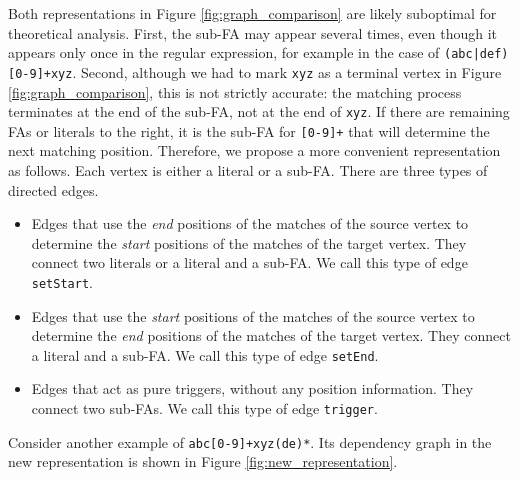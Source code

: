 Both representations in Figure \ref{fig:graph_comparison} are likely suboptimal for theoretical analysis. First, the sub-FA may appear several times, even though it appears only once in the regular expression, for example in the case of \texttt{(abc|def)[0-9]+xyz}. Second, although we had to mark \texttt{xyz} as a terminal vertex in Figure \ref{fig:graph_comparison}, this is not strictly accurate: the matching process terminates at the end of the sub-FA, not at the end of \texttt{xyz}. If there are remaining FAs or literals to the right, it is the sub-FA for \texttt{[0-9]+} that will determine the next matching position. Therefore, we propose a more convenient representation as follows. Each vertex is either a literal or a sub-FA. There are three types of directed edges.
\begin{itemize}
  \item Edges that use the \textit{end} positions of the matches of the source vertex to determine the \textit{start} positions of the matches of the target vertex. They connect two literals or a literal and a sub-FA. We call this type of edge \texttt{setStart}.
  \item Edges that use the \textit{start} positions of the matches of the source vertex to determine the \textit{end} positions of the matches of the target vertex. They connect a literal and a sub-FA. We call this type of edge \texttt{setEnd}.
  \item Edges that act as pure triggers, without any position information. They connect two sub-FAs. We call this type of edge \texttt{trigger}.
\end{itemize}

Consider another example of \texttt{abc[0-9]+xyz(de)*}. Its dependency graph in the new representation is shown in Figure \ref{fig:new_representation}.

